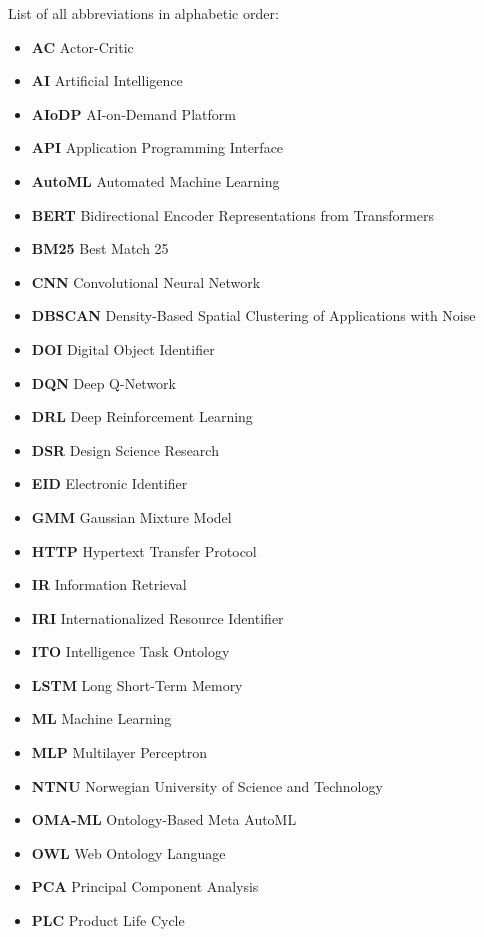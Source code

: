 
List of all abbreviations in alphabetic order:

\begin{itemize}
    \item \textbf{AC} Actor-Critic
    \item \textbf{AI} Artificial Intelligence
    \item \textbf{AIoDP} AI-on-Demand Platform
    \item \textbf{API} Application Programming Interface
    \item \textbf{AutoML} Automated Machine Learning
    \item \textbf{BERT} Bidirectional Encoder Representations from Transformers
    \item \textbf{BM25} Best Match 25
    \item \textbf{CNN} Convolutional Neural Network
    \item \textbf{DBSCAN} Density-Based Spatial Clustering of Applications with Noise
    \item \textbf{DOI} Digital Object Identifier
    \item \textbf{DQN} Deep Q-Network
    \item \textbf{DRL} Deep Reinforcement Learning
    \item \textbf{DSR} Design Science Research
    \item \textbf{EID} Electronic Identifier
    \item \textbf{GMM} Gaussian Mixture Model
    \item \textbf{HTTP} Hypertext Transfer Protocol
    \item \textbf{IR} Information Retrieval
    \item \textbf{IRI} Internationalized Resource Identifier
    \item \textbf{ITO} Intelligence Task Ontology
    \item \textbf{LSTM} Long Short-Term Memory
    \item \textbf{ML} Machine Learning
    \item \textbf{MLP} Multilayer Perceptron
    \item \textbf{NTNU} Norwegian University of Science and Technology
    \item \textbf{OMA-ML} Ontology-Based Meta AutoML
    \item \textbf{OWL} Web Ontology Language
    \item \textbf{PCA} Principal Component Analysis
    \item \textbf{PLC} Product Life Cycle

\end{itemize}
